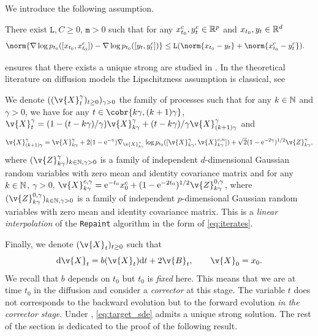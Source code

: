 We introduce the following assumption.

\begin{assumption}
	\label{assum:sde}
	There exist $\mathtt{L}, C \geq 0$, $\mathtt{m} >0$ such that for any $x_{t_0}^c, y_t^c \in \mathbb{R}^p$ and $x_{t_0}, y_t \in \mathbb{R}^d$ \begin{align}  & \norm{\nabla \log p_{t_0}([x_{t_0}, x_{t_0}^c]) - \nabla \log p_{t_0}([y_t, y_t^c])} \leq \mathtt{L} (\norm{x_{t_0} - y_t} + \norm{x_{t_0}^c - y_t^c}) .
	\end{align}
\end{assumption}

 ensures that there exists a unique strong
are studied in
\textcite{de2022convergence}.
In the theoretical literature on diffusion models the Lipschitzness assumption is classical, see 

We denote $((\v{X}_t^\gamma)_{t \geq 0})_{\gamma > 0}$ the family of processes such that for any $k \in \mathbb{N}$ and $\gamma >0$, we have for any $t \in \cobr{k \gamma, (k+1)\gamma}$, $\v{X}_t^\gamma = (1 - (t - k\gamma)/\gamma) \v{X}_{k\gamma}^\gamma + (t - k\gamma)/\gamma \v{X}_{(k+1)\gamma}^\gamma$ and \begin{equation} \v{X}_{(k+1)\gamma}^\gamma = \v{X}_{k\gamma}^\gamma + 2(1-\mathrm{e}^{-\gamma}) \nabla_{\v{X}_{k\gamma}^\gamma} \log p_{t_0}([\v{X}_{k\gamma}^\gamma, \v{X}_{k\gamma}^{c,n}]) + \sqrt{2}(1-\mathrm{e}^{-2\gamma})^{1/2} \v{Z}_{k\gamma}^\gamma , \end{equation} where $(\v{Z}_{k\gamma}^\gamma)_{k \in \N, \gamma > 0}$ is a family of independent $d$-dimensional Gaussian random variables with zero mean and identity covariance matrix and for any $k\in \mathbb{N}$, $\gamma > 0$, $\v{X}_{k\gamma}^{c,\gamma} = \mathrm{e}^{-t_0} x_0^c + (1 - \mathrm{e}^{-2t_0})^{1/2} \v{Z}_{k\gamma}^{0,\gamma}$, where $(\v{Z}_{k\gamma}^{0,\gamma})_{k \in \N, \gamma > 0}$ is a family of independent $p$-dimensional Gaussian random variables with zero mean and identity covariance matrix.
This is a \emph{linear interpolation} of the \texttt{Repaint} algorithm in the form of \eqref{eq:iterates}.

Finally, we denote $(\v{X}_t)_{t \geq 0}$ such that \begin{equation} \label{eq:target_sde} \mathrm{d} \v{X}_t = b(\v{X}_t) \mathrm{d} t + 2 \v{B}_t , \qquad \v{X}_0 = x_0 .
\end{equation}
We recall that $b$ depends on $t_0$ but $t_0$ is \emph{fixed} here.
This means that we are at time $t_0$ in the diffusion and consider a \emph{corrector} at this stage.
The variable $t$ does not corresponds to the backward evolution but to the forward evolution \emph{in the corrector stage}.
Under , \eqref{eq:target_sde} admits a unique strong solution.
The rest of the section is dedicated to the proof of the following result.

